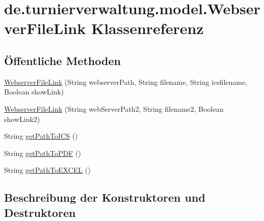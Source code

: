 \hypertarget{classde_1_1turnierverwaltung_1_1model_1_1_webserver_file_link}{}\section{de.\+turnierverwaltung.\+model.\+Webserver\+File\+Link Klassenreferenz}
\label{classde_1_1turnierverwaltung_1_1model_1_1_webserver_file_link}
\subsection*{Öffentliche Methoden}
\begin{DoxyCompactItemize}
\item 
\hyperlink{classde_1_1turnierverwaltung_1_1model_1_1_webserver_file_link_af6c1b3638e768fdadf392ce4ea9779c6}{Webserver\+File\+Link} (String webserver\+Path, String filename, String icsfilename, Boolean show\+Link)
\item 
\hyperlink{classde_1_1turnierverwaltung_1_1model_1_1_webserver_file_link_a3c32db14cb51c7ba678dfada22160261}{Webserver\+File\+Link} (String web\+Server\+Path2, String filename2, Boolean show\+Link2)
\item 
String \hyperlink{classde_1_1turnierverwaltung_1_1model_1_1_webserver_file_link_a29be2197f59c6911b5132ae7804644d6}{get\+Path\+To\+I\+CS} ()
\item 
String \hyperlink{classde_1_1turnierverwaltung_1_1model_1_1_webserver_file_link_a34883be629e3265100423f48dda9a75a}{get\+Path\+To\+P\+DF} ()
\item 
String \hyperlink{classde_1_1turnierverwaltung_1_1model_1_1_webserver_file_link_ab5834d8a5647879508eae5fcf3c8276d}{get\+Path\+To\+E\+X\+C\+EL} ()
\end{DoxyCompactItemize}


\subsection{Beschreibung der Konstruktoren und Destruktoren}
